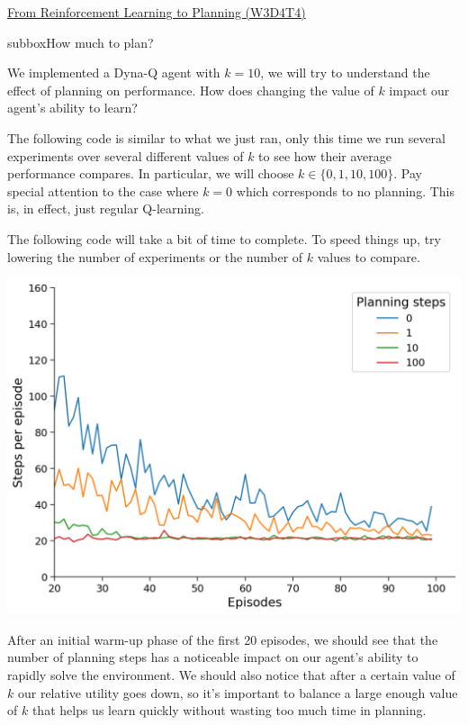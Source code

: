 \begin{textbox}{\href{https://compneuro.neuromatch.io/tutorials/W3D4_ReinforcementLearning/student/W3D4_Tutorial4.html}{From Reinforcement Learning to Planning (W3D4T4)} }

\begin{subbox}{subbox}{How much to plan?}
\scriptsize

We implemented a Dyna-Q agent with $k=10$, we will try to understand the effect of planning on performance. How does changing the value of $k$ impact our agent's ability to learn?

The following code is similar to what we just ran, only this time we run several experiments over several different values of $k$ to see how their average performance compares. In particular, we will choose $k \in \{0, 1, 10, 100\}$. Pay special attention to the case where $k = 0$ which corresponds to no planning. This is, in effect, just regular Q-learning.

The following code will take a bit of time to complete. To speed things up, try lowering the number of experiments or the number of $k$ values to compare.


\begin{center}
    
\includegraphics[scale=0.25]{Figures/RL/RL_Figure18.png}
\end{center}
After an initial warm-up phase of the first 20 episodes, we should see that the number of planning steps has a noticeable impact on our agent's ability to rapidly solve the environment. We should also notice that after a certain value of $k$ our relative utility goes down, so it's important to balance a large enough value of $k$ that helps us learn quickly without wasting too much time in planning.

\end{subbox}
\end{textbox}
